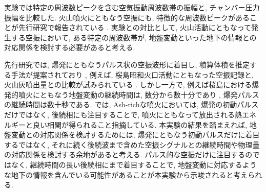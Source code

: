 \documentclass[12pt]{article}
\begin{document}
実験では特定の周波数ピークを含む空気振動周波数帯の振幅と, チャンバー圧力振幅を比較した. 火山噴火にともなう空振にも, 特徴的な周波数ピークがあることが先行研究で報告されている \citep{yokoo2012bo}. 実験との対比として, 火山活動にともなって発生する空振において, ある特定の周波数帯が, 地盤変動といった地下の情報との対応関係を検討する必要があると考える.

先行研究では, 爆発にともなうパルス状の空振波形に着目し, 積算体積を推定する手法が提案されており \citep{Johnson2003}, 例えば, 桜島昭和火口活動にともなった空振記録と, 火山灰噴出量との比較が試みられている \citep{Fee2017a}. しかし一方で, 例えば桜島における爆発的噴火にともなう地盤変動の継続時間は, 数分から数十分であり \citep{Iguchi2012, Iguchi2013a}, 爆発パルスの継続時間は数十秒である.
\cite{DelleDonne2016} では, Ash-richな噴火においては, 爆発の初動パルスだけではなく, 後続相にも注目することで, 噴火にともなって放出される熱エネルギーと良い相関が得られること指摘している. 本実験の結果を踏まえれば, 地盤変動との対応関係を検討するためには, 爆発にともなう初動パルスだけに着目するではなく, それに続く後続波まで含めた空振シグナルとの継続時間や物理量の対応関係を検討する余地があると考える. パルス的な空振だけに注目するのではなく, 継続時間の長い後続相にまで着目することで, 地盤変動に対応するような地下の情報を含んでいる可能性があることが本実験から示唆されると考えられる.



\clearpage \newpage

 
\end{document}
